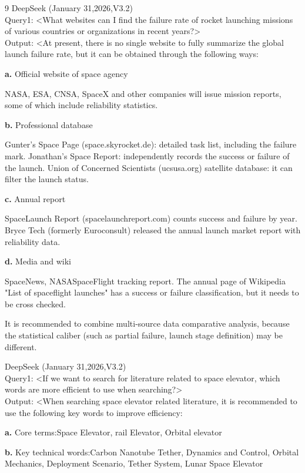 \documentclass[12pt]{mcmthesis}
\begin{document}
\begin{ReportAiUse}{9}
    DeepSeek (January 31,2026,V3.2)\\
    Query1: <What websites can I find the failure rate of rocket launching missions of various countries or organizations in recent years?>\\
    Output: <At present, there is no single website to fully summarize the global launch failure rate, but it can be obtained through the following ways:

    \textbf{a.}	Official website of space agency

    NASA, ESA, CNSA, SpaceX and other companies will issue mission reports, some of which include reliability statistics.

    \textbf{b.}	Professional database

    Gunter's Space Page (space.skyrocket.de): detailed task list, including the failure mark.
    Jonathan's Space Report: independently records the success or failure of the launch.
    Union of Concerned Scientists (ucsusa.org) satellite database: it can filter the launch status.

    \textbf{c.}	Annual report

    SpaceLaunch Report (spacelaunchreport.com) counts success and failure by year.
    Bryce Tech (formerly Euroconsult) released the annual launch market report with reliability data.

    \textbf{d.}	Media and wiki

    SpaceNews, NASASpaceFlight tracking report.
    The annual page of Wikipedia "List of spaceflight launches" has a success or failure classification, but it needs to be cross checked.

    It is recommended to combine multi-source data comparative analysis, because the statistical caliber (such as partial failure, launch stage definition) may be different.

    DeepSeek (January 31,2026,V3.2)\\
    Query1: <If we want to search for literature related to space elevator, which words are more efficient to use when searching?>\\
    Output: <When searching space elevator related literature, it is recommended to use the following key words to improve efficiency:

    \textbf{a.}	Core terms:Space Elevator, rail Elevator, Orbital elevator


    \textbf{b.}	Key technical words:Carbon Nanotube Tether, Dynamics and Control, Orbital Mechanics, Deployment Scenario, Tether System, Lunar Space Elevator


\end{ReportAiUse}
\end{document}
